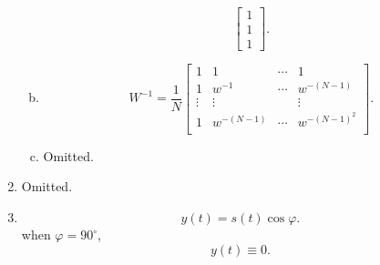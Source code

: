 \documentclass{article}
\begin{document}
\begin{enumerate}
\begin{enumerate}[(a)]
\[\begin{bmatrix}
                        1 \\ 1 \\ 1
                    \end{bmatrix}.
                \]
                \item \[
                    W^{-1} = \frac{1}{N}\begin{bmatrix}
                        1 & 1 & \cdots & 1 \\
                        1 & w^{-1} & \cdots & w^{-(N - 1)}  \\
                        \vdots & \vdots &  & \vdots  \\
                        1 & w^{-(N-1)} & \cdots & w^{-(N - 1)^2}  \\
                    \end{bmatrix}.
                \]
                \item Omitted.
            \end{enumerate}	
            
            \item Omitted.
            
            \item \[
                y(t) = s(t)\cos\varphi.
            \]
            when $\varphi = 90^\circ$, \[
                y(t) \equiv 0.
            \]
        \end{enumerate}
        \newpage
    
\end{document}
